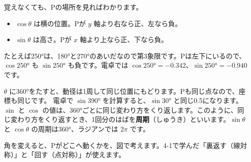 \noindent\begin{minipage}[c]{0.46\linewidth}
\centering
{}
\end{minipage}\hfill
\begin{minipage}[c]{0.5\linewidth}
\raggedright
覚えなくても、Pの場所を見ればわかります。
\begin{itemize}[leftmargin=1.2\zw, itemsep=2pt, topsep=2pt, label={\color{\bkTT}●}]
\item $\cos\theta$ は横の位置。Pが $y$ 軸より右なら正、左なら負。
\item $\sin\theta$ は高さ。Pが $x$ 軸より上なら正、下なら負。
\end{itemize}
\end{minipage}\par\vspace{4pt}
たとえば250°は、180°と270°のあいだなので第3象限です。Pは左下にいるので、$\cos250°$ も $\sin250°$ も負です。電卓では $\cos250°=-0.342$、$\sin250°=-0.940$ です。

$\theta$ に360°をたすと、動径は1周して同じ位置にもどります。Pも同じ点なので、座標も同じです。
電卓で $\sin390°$ を計算すると、$\sin30°$ と同じ0.5になります。$\sin$ と $\cos$ の値は、360°ごとに同じ変わり方をくり返します。このように、同じ変わり方をくり返すとき、1回分のはばを\textbf{周期}（しゅうき）といいます。$\sin\theta$ と $\cos\theta$ の周期は360°、ラジアンでは $2\pi$ です。

角を変えると、Pがどこへ動くかを、図で考えます。4-1で学んだ「裏返す（線対称）」と「回す（点対称）」が使えます。

